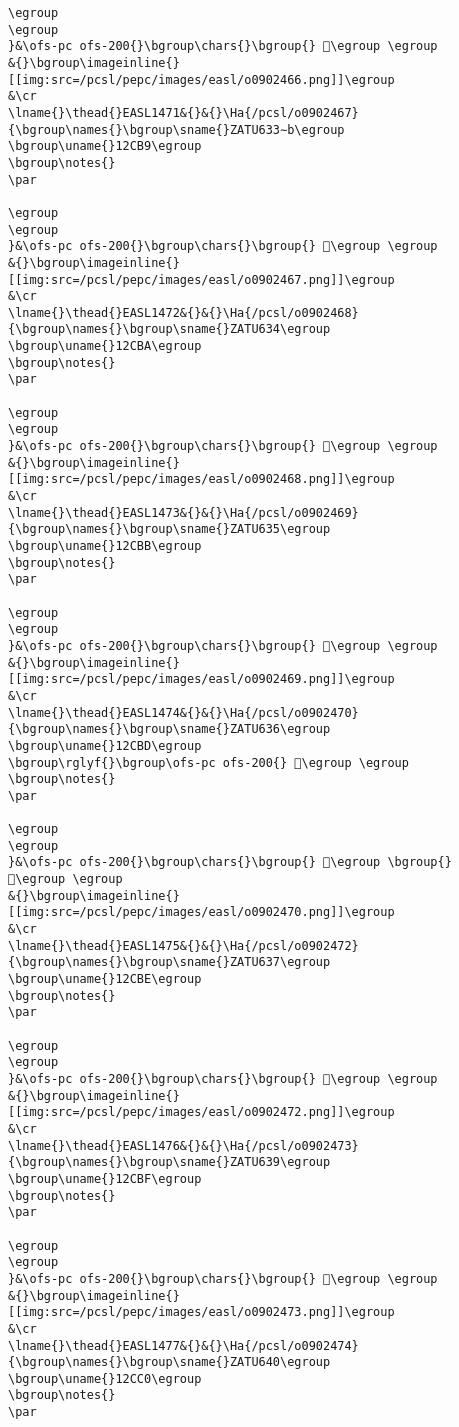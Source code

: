 \begin{verbatim}
\egroup
\egroup
}&\ofs-pc ofs-200{}\bgroup\chars{}\bgroup{} 𒲸\egroup \egroup
&{}\bgroup\imageinline{}[[img:src=/pcsl/pepc/images/easl/o0902466.png]]\egroup
&\cr
\lname{}\thead{}EASL1471&{}&{}\Ha{/pcsl/o0902467}{\bgroup\names{}\bgroup\sname{}ZATU633∼b\egroup
\bgroup\uname{}12CB9\egroup
\bgroup\notes{}
\par 

\egroup
\egroup
}&\ofs-pc ofs-200{}\bgroup\chars{}\bgroup{} 𒲹\egroup \egroup
&{}\bgroup\imageinline{}[[img:src=/pcsl/pepc/images/easl/o0902467.png]]\egroup
&\cr
\lname{}\thead{}EASL1472&{}&{}\Ha{/pcsl/o0902468}{\bgroup\names{}\bgroup\sname{}ZATU634\egroup
\bgroup\uname{}12CBA\egroup
\bgroup\notes{}
\par 

\egroup
\egroup
}&\ofs-pc ofs-200{}\bgroup\chars{}\bgroup{} 𒲺\egroup \egroup
&{}\bgroup\imageinline{}[[img:src=/pcsl/pepc/images/easl/o0902468.png]]\egroup
&\cr
\lname{}\thead{}EASL1473&{}&{}\Ha{/pcsl/o0902469}{\bgroup\names{}\bgroup\sname{}ZATU635\egroup
\bgroup\uname{}12CBB\egroup
\bgroup\notes{}
\par 

\egroup
\egroup
}&\ofs-pc ofs-200{}\bgroup\chars{}\bgroup{} 𒲻\egroup \egroup
&{}\bgroup\imageinline{}[[img:src=/pcsl/pepc/images/easl/o0902469.png]]\egroup
&\cr
\lname{}\thead{}EASL1474&{}&{}\Ha{/pcsl/o0902470}{\bgroup\names{}\bgroup\sname{}ZATU636\egroup
\bgroup\uname{}12CBD\egroup
\bgroup\rglyf{}\bgroup\ofs-pc ofs-200{} 𒲽\egroup \egroup
\bgroup\notes{}
\par 

\egroup
\egroup
}&\ofs-pc ofs-200{}\bgroup\chars{}\bgroup{} 𒲼\egroup \bgroup{} 𒲽\egroup \egroup
&{}\bgroup\imageinline{}[[img:src=/pcsl/pepc/images/easl/o0902470.png]]\egroup
&\cr
\lname{}\thead{}EASL1475&{}&{}\Ha{/pcsl/o0902472}{\bgroup\names{}\bgroup\sname{}ZATU637\egroup
\bgroup\uname{}12CBE\egroup
\bgroup\notes{}
\par 

\egroup
\egroup
}&\ofs-pc ofs-200{}\bgroup\chars{}\bgroup{} 𒲾\egroup \egroup
&{}\bgroup\imageinline{}[[img:src=/pcsl/pepc/images/easl/o0902472.png]]\egroup
&\cr
\lname{}\thead{}EASL1476&{}&{}\Ha{/pcsl/o0902473}{\bgroup\names{}\bgroup\sname{}ZATU639\egroup
\bgroup\uname{}12CBF\egroup
\bgroup\notes{}
\par 

\egroup
\egroup
}&\ofs-pc ofs-200{}\bgroup\chars{}\bgroup{} 𒲿\egroup \egroup
&{}\bgroup\imageinline{}[[img:src=/pcsl/pepc/images/easl/o0902473.png]]\egroup
&\cr
\lname{}\thead{}EASL1477&{}&{}\Ha{/pcsl/o0902474}{\bgroup\names{}\bgroup\sname{}ZATU640\egroup
\bgroup\uname{}12CC0\egroup
\bgroup\notes{}
\par 


\end{verbatim}
